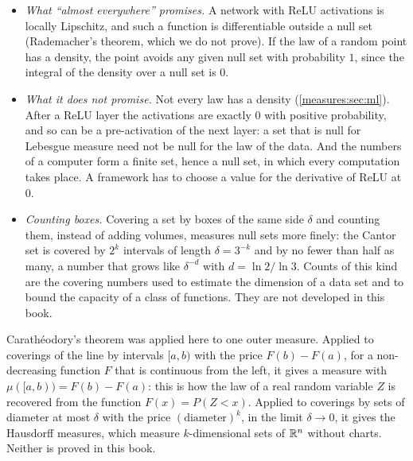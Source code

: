 \begin{notechapter}
\begin{mlthread}
\begin{itemize}[nosep]
  \item \emph{What ``almost everywhere'' promises.} A network with
        ReLU activations is locally Lipschitz, and such a function is
        differentiable outside a null set (Rademacher's theorem, which
        we do not prove). If the law of a random point has a density,
        the point avoids any given null set with probability $1$,
        since the integral of the density over a null set is $0$.
  \item \emph{What it does not promise.} Not every law has a density
        (\cref{measures:sec:ml}). After a ReLU layer the activations
        are exactly $0$ with positive probability, and so can be a
        pre-activation of the next layer: a set that is null for
        Lebesgue measure need not be null for the law of the data.
        And the numbers of a computer form a finite set, hence a null
        set, in which every computation takes place. A framework has
        to choose a value for the derivative of ReLU at $0$.
  \item \emph{Counting boxes.} Covering a set by boxes of the same
        side $\delta$ and counting them, instead of adding volumes,
        measures null sets more finely: the Cantor set is covered by
        $2^k$ intervals of length $\delta = 3^{-k}$ and by no fewer
        than half as many, a number that grows like $\delta^{-d}$
        with $d = \ln2/\ln3$. Counts of this kind are
        the covering numbers used to estimate the dimension of a data
        set and to bound the capacity of a class of functions. They
        are not developed in this book.
\end{itemize}
\end{mlthread}

Carath\'eodory's theorem was applied here to one outer measure. Applied
to coverings of the line by intervals $[a, b)$ with the price
$F(b) - F(a)$, for a non-decreasing function $F$ that is continuous
from the left, it gives a measure with
$\mu([a, b)) = F(b) - F(a)$: this is how the law of a real random
variable $Z$ is recovered from the function $F(x) = P(Z < x)$. Applied
to coverings by sets of diameter at most $\delta$ with the price
$(\text{diameter})^k$, in the limit $\delta\to0$, it gives the
Hausdorff measures, which measure $k$-dimensional sets of $\mathbb{R}^n$
without charts. Neither is proved in this book.


\end{notechapter}
